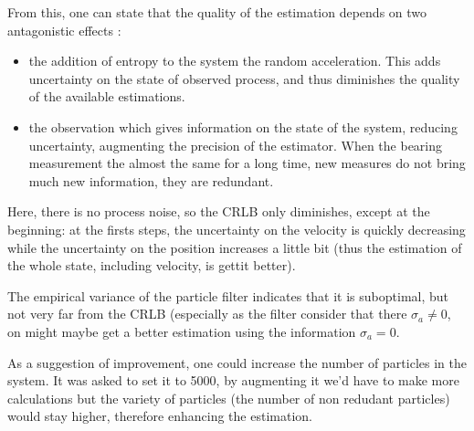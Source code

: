 \documentclass[english,DIV=13]{scrreprt}
\begin{document}
From this, one can state that the quality of the estimation depends on two antagonistic effects : 
\begin{itemize}
\item the addition of entropy to the system the random acceleration. This adds uncertainty on the
    state of observed process, and thus diminishes the quality of the available estimations.
\item the observation which gives information on the state of the system, reducing uncertainty,
    augmenting the precision of the estimator. When the bearing measurement the almost the same for
        a long time, new measures do not bring much new information, they are redundant.
\end{itemize}
Here, there is no process noise, so the CRLB only diminishes, except at the beginning: at the firsts steps,
the uncertainty on the velocity is quickly decreasing while the uncertainty on the position increases a little bit
(thus the estimation of the whole state, including velocity, is gettit better).

The empirical variance of the particle filter indicates that it is suboptimal, but not very far from the CRLB
(especially as the filter consider that there $\sigma_a \neq 0$, on might maybe get a better estimation using
the information $\sigma_a = 0$.

As a suggestion of improvement, one could increase the number of particles in the system. It was asked to set it to 5000, 
by augmenting it we'd have to make more calculations but the variety of particles (the number of non redudant particles)
would stay higher, therefore enhancing the estimation.
\end{document}
